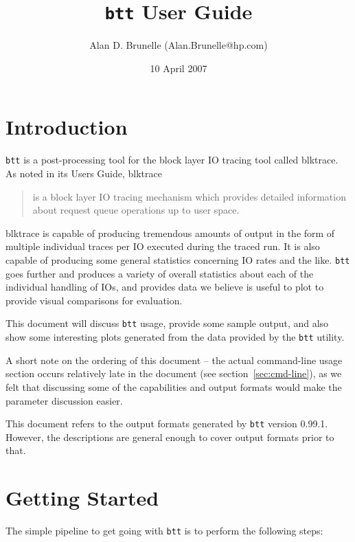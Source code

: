 \documentclass{article}
\title{\texttt{btt} User Guide}
\author{Alan D. Brunelle (Alan.Brunelle@hp.com)}
\date{10 April 2007}
\begin{document}
\maketitle
\section{\label{sec:intro}Introduction}

\texttt{btt} is a post-processing tool for the block layer IO tracing tool called blktrace. As noted in its Users Guide, blktrace 
  \begin{quotation}
    is a block layer IO tracing mechanism which provides detailed
    information about request queue operations up to user space.
  \end{quotation}

blktrace is capable of producing tremendous amounts of output in the
form of multiple individual traces per IO executed during the traced
run. It is also capable of producing some general statistics concerning
IO rates and the like. \texttt{btt} goes further and produces a variety
of overall statistics about each of the individual handling of IOs, and
provides data we believe is useful to plot to provide visual comparisons
for evaluation.

This document will discuss \texttt{btt} usage, provide some sample output,
and also show some interesting plots generated from the data provided
by the \texttt{btt} utility.

\bigskip
A short note on the ordering of this document -- the actual
command-line usage section occurs relatively late in the document (see
section~\ref{sec:cmd-line}), as we felt that discussing some of the
capabilities and output formats would make the parameter discussion
easier.

\bigskip
  This document refers to the output formats generated by \texttt{btt}
  version 0.99.1.  However, the descriptions are general enough to cover
  output formats prior to that.

\newpage\tableofcontents

\newpage\section{\label{sec:getting-started}Getting Started}

  The simple pipeline to get going with \texttt{btt} is to perform the
  following steps:
\end{document}
